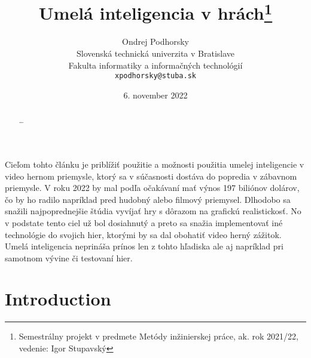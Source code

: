 \documentclass{article}
\title{Umelá inteligencia v hrách\thanks{Semestrálny projekt v predmete Metódy inžinierskej práce, ak. rok 2021/22, vedenie: Igor Stupavský}}
\author{Ondrej Podhorsky\\[2pt]
	{\small Slovenská technická univerzita v Bratislave}\\
	{\small Fakulta informatiky a informačných technológií}\\
	{\small \texttt{xpodhorsky@stuba.sk}}
	}
\date{\small 6. november 2022}
\begin{document}
\maketitle

\begin{abstract}
\ldots
\end{abstract}

Cieľom tohto článku je priblížiť použitie a možnosti použitia umelej inteligencie v video hernom priemysle, ktorý sa v súčasnosti dostáva do popredia v zábavnom priemysle. V roku 2022 by mal podľa očakávaní mať výnos 197 biliónov dolárov, čo by ho radilo napríklad pred hudobný alebo filmový priemysel. Dlhodobo sa snažili najpoprednejšie štúdia vyvíjať hry s dôrazom  na grafickú realistickosť. No v podstate tento ciel už bol dosiahnutý a preto sa snažia implementovať iné technológie do svojich hier, ktorými by sa dal obohatiť video herný zážitok. Umelá inteligencia neprináša prínos len z tohto hľadiska ale aj napríklad pri samotnom vývine či testovaní hier.

\section{Introduction}
\end{document}
